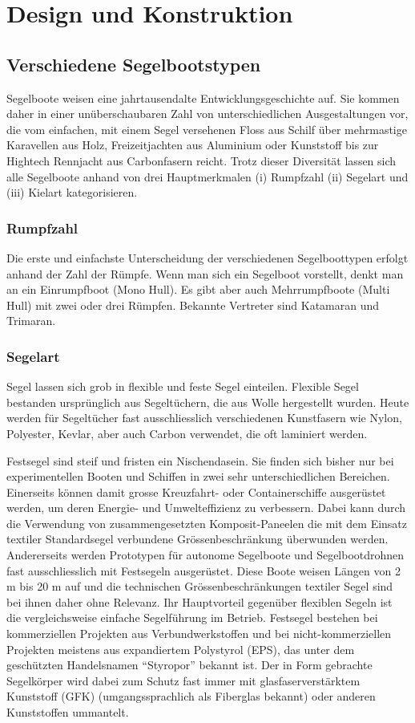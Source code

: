 \label{chap:konstruktion}
\chapter{Design und Konstruktion}
\section{Verschiedene Segelbootstypen}
Segelboote weisen eine jahrtausendalte Entwicklungsgeschichte auf. Sie kommen daher in einer unüberschaubaren Zahl von unterschiedlichen Ausgestaltungen vor, die vom einfachen, mit einem Segel versehenen Floss aus Schilf über mehrmastige Karavellen aus Holz, Freizeitjachten aus Aluminium oder Kunststoff bis zur Hightech Rennjacht aus Carbonfasern reicht. Trotz dieser Diversität lassen sich alle Segelboote anhand von drei Hauptmerkmalen (i) Rumpfzahl (ii) Segelart und (iii) Kielart kategorisieren.
\subsection{Rumpfzahl}
Die erste und einfachste Unterscheidung der verschiedenen Segelboottypen erfolgt anhand der Zahl der Rümpfe. Wenn man sich ein Segelboot vorstellt, denkt man an ein Einrumpfboot (Mono Hull). Es gibt aber auch Mehrrumpfboote (Multi Hull) mit zwei oder drei Rümpfen. Bekannte Vertreter sind Katamaran und Trimaran.
\subsection{Segelart}
Segel lassen sich grob in flexible und feste Segel einteilen. Flexible Segel bestanden ursprünglich aus Segeltüchern, die aus Wolle hergestellt wurden. Heute werden für Segeltücher fast ausschliesslich verschiedenen Kunstfasern wie Nylon, Polyester, Kevlar, aber auch Carbon verwendet, die oft laminiert werden. 

Festsegel sind steif und fristen ein Nischendasein. Sie finden sich bisher nur bei experimentellen Booten und Schiffen in zwei sehr unterschiedlichen Bereichen. Einerseits können damit grosse Kreuzfahrt- oder Containerschiffe ausgerüstet werden, um deren Energie- und Umwelteffizienz zu verbessern. Dabei kann durch die Verwendung von zusammengesetzten Komposit-Paneelen die mit dem Einsatz textiler Standardsegel verbundene Grössenbeschränkung überwunden werden. \cite{redaktion_bv-grundsatz-zulassung_2022} Andererseits werden Prototypen für autonome Segelboote und Segelbootdrohnen fast ausschliesslich mit Festsegeln ausgerüstet. Diese Boote weisen Längen von 2 m bis 20 m auf und die technischen Grössenbeschränkungen textiler Segel sind bei ihnen daher ohne Relevanz. Ihr Hauptvorteil gegenüber flexiblen Segeln ist die vergleichsweise einfache Segelführung im Betrieb. Festsegel bestehen bei kommerziellen Projekten aus Verbundwerkstoffen und bei nicht-kommerziellen Projekten meistens aus expandiertem Polystyrol (EPS), das unter dem geschützten Handelsnamen \enquote{Styropor} bekannt ist. Der in Form gebrachte Segelkörper wird dabei zum Schutz fast immer mit glasfaserverstärktem Kunststoff (GFK) (umgangssprachlich als Fiberglas bekannt) oder anderen Kunststoffen ummantelt.
